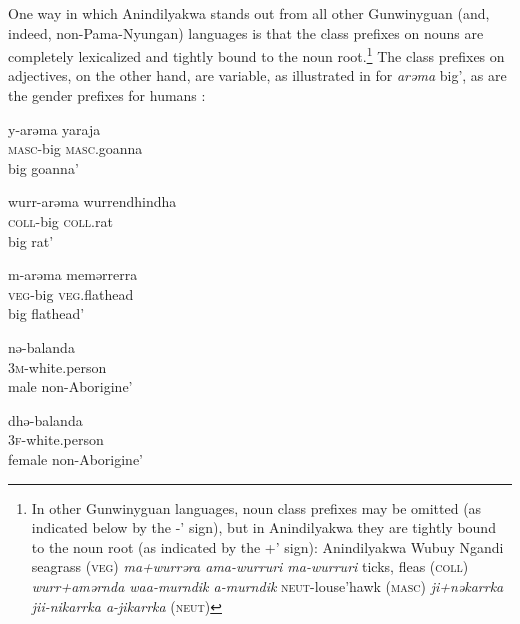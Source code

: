 \documentclass[output=paper]{langscibook}
\begin{document}
One way in which Anindilyakwa stands out from all other Gunwinyguan (and, indeed, non-Pama-Nyungan) languages is that the class prefixes on nouns are completely lexicalized and tightly bound to the noun root.\footnote{In other Gunwinyguan languages, noun class prefixes may be omitted (as indicated below by the -’ sign), but in Anindilyakwa they are tightly bound to the noun root (as indicated by the +’ sign): Anindilyakwa Wubuy Ngandi seagrass (\textsc{veg}) \textit{ma+wurrəra ama-wurruri ma-wurruri} ticks, fleas (\textsc{coll}) \textit{wurr+amərnda waa-murndik a-murndik} \textsc{neut}-louse’hawk (\textsc{masc}) \textit{ji+nəkarrka jii-nikarrka a-jikarrka} (\textsc{neut})} The class prefixes on adjectives, on the other hand, are variable, as illustrated in  for \textit{arəma} big’, as are the gender prefixes for humans :



%  

\ea%
 \label{ex:vanegmond:3}
 \ea 
 \gll y-arəma yaraja\\
 \textsc{masc}-big \textsc{masc}.goanna \\
\glt big goanna’ 

\ex
 \gll wurr-arəma wurrendhindha\\ \textsc{coll}-big \textsc{coll}.rat \\
\glt big rat’

\ex
 \gll  m-arəma memərrerra\\
 \textsc{veg}-big \textsc{veg}.flathead\\

\glt big flathead’


\z
\z



\ea%
 \label{ex:vanegmond:4}
 \ea
 \label{ex:vanegmond:4a}
 \gll nə-balanda  \\
 \textsc{3m}-white.person\\ 
 \glt male non-Aborigine’  

 \ex
 \label{ex:vanegmond:4b}
 \gll dhə-balanda\\
 \textsc{3f}-white.person\\
 \glt female non-Aborigine’
 
\end{document}
